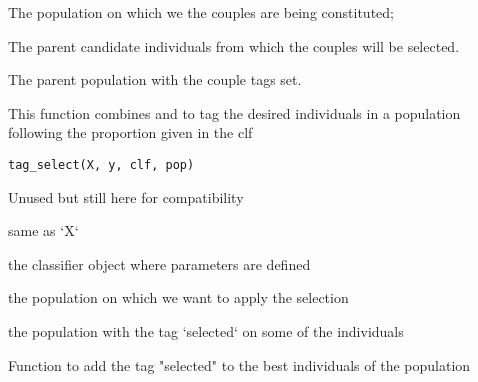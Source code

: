 \documentclass[a4paper]{book}
\begin{document}
%
\begin{Arguments}
\begin{ldescription}
\item[\code{pop:}] The population on which we the couples are being constituted;

\item[\code{parents:}] The parent candidate individuals from which the couples will 
be selected.
\end{ldescription}
\end{Arguments}
%
\begin{Value}
The parent population with the couple tags set.
\end{Value}
%
\begin{Description}
This function combines  and 
to tag the desired individuals in a population following the proportion given in the clf
\end{Description}
%
\begin{Usage}
\begin{verbatim}
tag_select(X, y, clf, pop)
\end{verbatim}
\end{Usage}
%
\begin{Arguments}
\begin{ldescription}
\item[\code{X:}] Unused but still here for compatibility

\item[\code{y:}] same as `X`

\item[\code{clf:}] the classifier object where parameters are defined

\item[\code{pop:}] the population on which we want to apply the selection
\end{ldescription}
\end{Arguments}
%
\begin{Value}
the population with the tag `selected` on some of the individuals
\end{Value}
%
\begin{Description}
Function to add the tag "selected" to the best individuals of the population
\end{Description}
\end{document}
